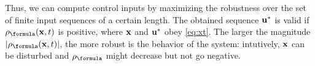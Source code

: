 Thus, we can compute control inputs by maximizing the robustness over the set of finite input sequences of a certain length.
The obtained sequence $\mathbf{u}^*$ is valid if $\robf(\sstraj,t)$ is positive, where $\mathbf{x}$ and $\mathbf{u}^*$ obey \eqref{eq:xt}.
The larger the magnitude $|\robf(\sstraj,t)|$, the more robust is the behavior of the system: intutively, $\mathbf{x}$ can be disturbed and $\robf$ might decrease but not go negative.
